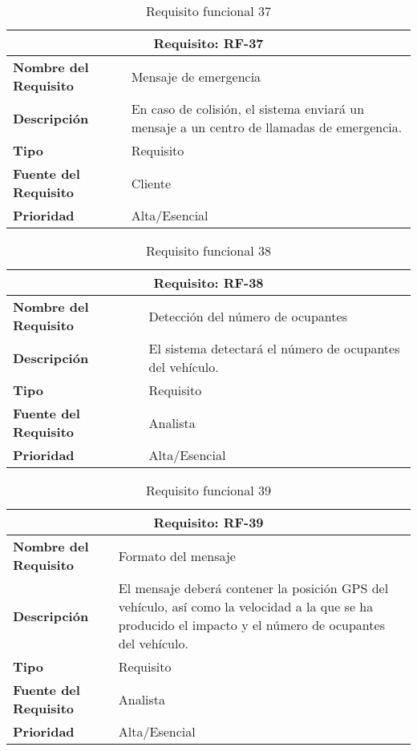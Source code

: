 \begin{table}[H]
\begin{center}
\begin{tabular}{p{} p{7cm}}
\multicolumn{2}{c}{\textbf{Requisito: RF-37} } \\
\hline \hline
\textbf{Nombre del Requisito} & Mensaje de emergencia\\
\hline
\textbf{Descripción} &En caso de colisión, el sistema enviará un mensaje a un centro de llamadas de emergencia.\\
\hline
\textbf{Tipo} & Requisito  \\
\hline
\textbf{Fuente del Requisito} & Cliente  \\
\hline
\textbf{Prioridad} & Alta/Esencial  \\ \hline
\end{tabular}
\caption{Requisito funcional 37}
\label{tab:RF-37}
\end{center}
\end{table}

\begin{table}[H]
\begin{center}
\begin{tabular}{p{} p{7cm}}
\multicolumn{2}{c}{\textbf{Requisito: RF-38} } \\
\hline \hline
\textbf{Nombre del Requisito} & Detección del número de ocupantes\\
\hline
\textbf{Descripción} & El sistema detectará el número de ocupantes del vehículo.\\
\hline
\textbf{Tipo} & Requisito  \\
\hline
\textbf{Fuente del Requisito} & Analista  \\
\hline
\textbf{Prioridad} & Alta/Esencial  \\ \hline
\end{tabular}
\caption{Requisito funcional 38}
\label{tab:RF-38}
\end{center}
\end{table}

\begin{table}[H]
\begin{center}
\begin{tabular}{p{} p{7cm}}
\multicolumn{2}{c}{\textbf{Requisito: RF-39} } \\
\hline \hline
\textbf{Nombre del Requisito} & Formato del mensaje\\
\hline
\textbf{Descripción} & El mensaje deberá contener la posición GPS del vehículo, así como la velocidad a la que se ha producido el impacto y el número de ocupantes del vehículo.\\
\hline
\textbf{Tipo} & Requisito  \\
\hline
\textbf{Fuente del Requisito} & Analista  \\
\hline
\textbf{Prioridad} & Alta/Esencial  \\ \hline
\end{tabular}
\caption{Requisito funcional 39}
\label{tab:RF-39}
\end{center}
\end{table}


